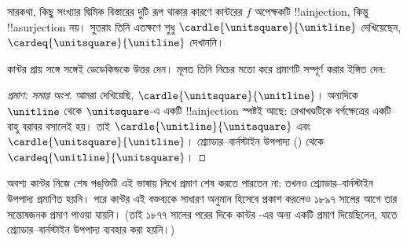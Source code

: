 \documentclass[../../../include/open-logic-section]{subfiles}
\begin{document}
সারকথা, কিছু সংখ্যার দ্বিমিক বিস্তারের দুটি রূপ
থাকার কারণে কান্টরের $f$ অপেক্ষকটি
!!a{injection}, কিন্তু !!a{surjection} নয়।
সুতরাং তিনি এতক্ষণে শুধু
$\cardle{\unitsquare}{\unitline}$ দেখিয়েছেন,
$\cardeq{\unitsquare}{\unitline}$ দেখাননি।

কান্টর প্রায় সঙ্গে সঙ্গেই ডেডেকিন্ডকে উত্তর দেন।
মূলত তিনি নিচের মতো করে প্রমাণটি সম্পূর্ণ
করার ইঙ্গিত দেন:

\begin{proof}[প্রমাণ: সমাপ্ত অংশ]
আমরা দেখিয়েছি,
$\cardle{\unitsquare}{\unitline}$।
অন্যদিকে $\unitline$ থেকে $\unitsquare$-এ
একটি !!a{injection} স্পষ্টই আছে:
রেখাখণ্ডটিকে বর্গক্ষেত্রের একটি বাহু বরাবর
বসালেই হয়। তাই
$\cardle{\unitline}{\unitsquare}$ এবং
$\cardle{\unitsquare}{\unitline}$।
শ্র্যোডার--বার্নস্টাইন উপপাদ্য
()
থেকে $\cardeq{\unitline}{\unitsquare}$।
\end{proof}

অবশ্য কান্টর নিজে শেষ পঙ্‌ক্তিটি এই ভাষায়
লিখে প্রমাণ শেষ করতে পারতেন না: তখনও
শ্র্যোডার--বার্নস্টাইন উপপাদ্য প্রমাণিত হয়নি।
পরে কান্টর এই বক্তব্যকে সাধারণ অনুমান
হিসেবে প্রকাশ করলেও ১৮৯৭ সালের আগে
তার সন্তোষজনক প্রমাণ পাওয়া যায়নি।
(তাই ১৮৭৭ সালের পরের দিকে কান্টর
-এর অন্য একটি
প্রমাণ দিয়েছিলেন, যাতে শ্র্যোডার--বার্নস্টাইন
উপপাদ্য ব্যবহার করা হয়নি।)
\end{document}
